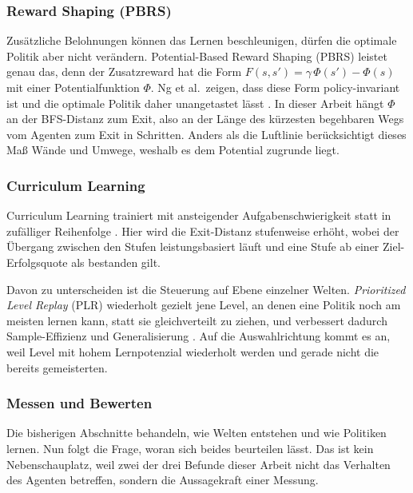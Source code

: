 \documentclass[11pt,a4paper]{article}
\begin{document}
\subsubsection{Reward Shaping (PBRS)}
\label{sec:pbrs}

Zusätzliche Belohnungen können das Lernen beschleunigen, dürfen die optimale
Politik aber nicht verändern. Potential-Based Reward Shaping (PBRS) leistet
genau das, denn der Zusatzreward hat die Form
$F(s,s') = \gamma\,\Phi(s') - \Phi(s)$ mit einer Potentialfunktion $\Phi$. Ng
et al.\ zeigen, dass diese Form policy-invariant ist und die optimale Politik
daher unangetastet lässt \cite{ng1999policy}. In dieser Arbeit hängt $\Phi$ an
der BFS-Distanz zum Exit, also an der Länge des kürzesten begehbaren Wegs vom
Agenten zum Exit in Schritten. Anders als die Luftlinie berücksichtigt dieses
Maß Wände und Umwege, weshalb es dem Potential zugrunde liegt.

\subsubsection{Curriculum Learning}
\label{sec:curriculum}

Curriculum Learning trainiert mit ansteigender Aufgabenschwierigkeit statt in
zufälliger Reihenfolge \cite{bengio2009curriculum}. Hier wird die Exit-Distanz
stufenweise erhöht, wobei der Übergang zwischen den Stufen leistungsbasiert
läuft und eine Stufe ab einer Ziel-Erfolgsquote als bestanden gilt.

Davon zu unterscheiden ist die Steuerung auf Ebene einzelner Welten.
\emph{Prioritized Level Replay} (PLR) wiederholt gezielt jene Level, an denen
eine Politik noch am meisten lernen kann, statt sie gleichverteilt zu ziehen,
und verbessert dadurch Sample-Effizienz und Generalisierung \cite{jiang2021plr}.
Auf die Auswahlrichtung kommt es an, weil Level mit hohem Lernpotenzial
wiederholt werden und gerade nicht die bereits gemeisterten.

\subsubsection{Messen und Bewerten}
\label{sec:g_messen}

Die bisherigen Abschnitte behandeln, wie Welten entstehen und wie Politiken
lernen. Nun folgt die Frage, woran sich beides beurteilen lässt. Das ist kein
Nebenschauplatz, weil zwei der drei Befunde dieser Arbeit nicht das Verhalten
des Agenten betreffen, sondern die Aussagekraft einer Messung.
\end{document}
